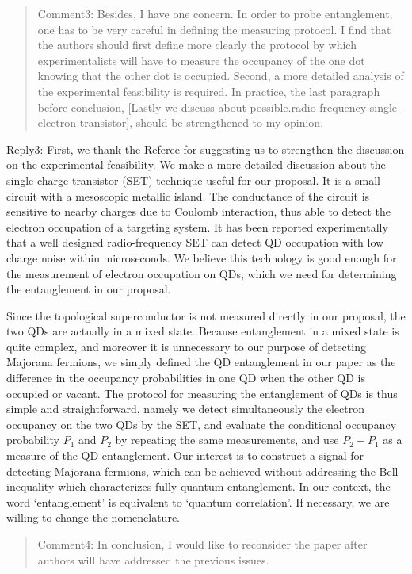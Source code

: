 \documentclass[11pt]{article}
\begin{document}
\begin{quote}
Comment3: Besides, I have one concern. In order to probe entanglement,
one has to be very careful in defining the measuring protocol. I find
that the authors should first define more clearly the protocol by which
experimentalists will have to measure the occupancy of the one dot
knowing that the other dot is occupied. Second, a more detailed analysis
of the experimental feasibility is required. In practice, the last
paragraph before conclusion, {[}Lastly we discuss about
possible.radio-frequency single-electron transistor{]}, should be
strengthened to my opinion.
\end{quote}

Reply3: First, we thank the Referee for suggesting us to strengthen the
discussion on the experimental feasibility. We make a more detailed
discussion about the single charge transistor (SET) technique useful for
our proposal. It is a small circuit with a mesoscopic metallic island.
The conductance of the circuit is sensitive to nearby charges due to
Coulomb interaction, thus able to detect the electron occupation of a
targeting system. It has been reported experimentally that a well
designed radio-frequency SET can detect QD occupation with low charge
noise within microseconds. We believe this technology is good enough for
the measurement of electron occupation on QDs, which we need for
determining the entanglement in our proposal.

Since the topological superconductor is not measured directly in our
proposal, the two QDs are actually in a mixed state. Because
entanglement in a mixed state is quite complex, and moreover it is
unnecessary to our purpose of detecting Majorana fermions, we simply
defined the QD entanglement in our paper as the difference in the
occupancy probabilities in one QD when the other QD is occupied or
vacant. The protocol for measuring the entanglement of QDs is thus
simple and straightforward, namely we detect simultaneously the electron
occupancy on the two QDs by the SET, and evaluate the conditional
occupancy probability \(P_1\) and \(P_2\) by repeating the same
measurements, and use \(P_2-P_1\) as a measure of the QD entanglement.
Our interest is to construct a signal for detecting Majorana fermions,
which can be achieved without addressing the Bell inequality which
characterizes fully quantum entanglement. In our context, the word
`entanglement' is equivalent to `quantum correlation'. If necessary, we
are willing to change the nomenclature.

\begin{quote}
Comment4: In conclusion, I would like to reconsider the paper after
authors will have addressed the previous issues.
\end{quote}
\end{document}

